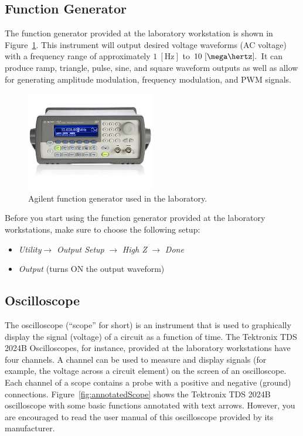 \subsection{Function Generator}
\label{sec:functionGenerator}
The function generator provided at the laboratory workstation is shown in Figure~\ref{fig:Agilent33210A-FunctionGenerator}. This instrument will output desired voltage waveforms (AC voltage) with a frequency range of approximately $1~[\si{\hertz}]$ to $10~[\mega\hertz].$ It can produce ramp, triangle, pulse, sine, and square waveform outputs as well as allow for generating amplitude modulation, frequency modulation, and PWM signals. %
\begin{figure}
    \centering
    \includegraphics[width=0.5\textwidth]{figs/img/labs/Agilent33210A-FunctionGenerator.jpg}
    \caption{Agilent function generator used in the laboratory.}
    \label{fig:Agilent33210A-FunctionGenerator}
  \end{figure}
%  
Before you start using the function generator provided at the laboratory workstations, make sure to choose the following setup: 

\begin{itemize}
    \item \emph{Utility}$\rightarrow$ \emph{Output Setup} $\rightarrow$ \emph{High Z} $\rightarrow$ \emph{Done}
    \item \emph{Output} (turns ON the output waveform) 
\end{itemize}


\subsection{Oscilloscope}
\label{sec:oscilloscope}
The oscilloscope (``scope'' for short) is an instrument that is used to
graphically display the signal (voltage) of a circuit as a function of time. The
Tektronix TDS 2024B Oscilloscopes, for instance, provided at the laboratory
workstations have four channels. A channel can be used to measure and display
signals (for example, the voltage across a circuit element) on the screen of an
oscilloscope. Each channel of a scope contains a probe with a positive and
negative (ground) connections. Figure~\ref{fig:annotatedScope} shows the
Tektronix TDS 2024B oscilloscope with some basic functions annotated with text
arrows. However, you are encouraged to read the user manual of this
oscilloscope provided by its manufacturer. %

